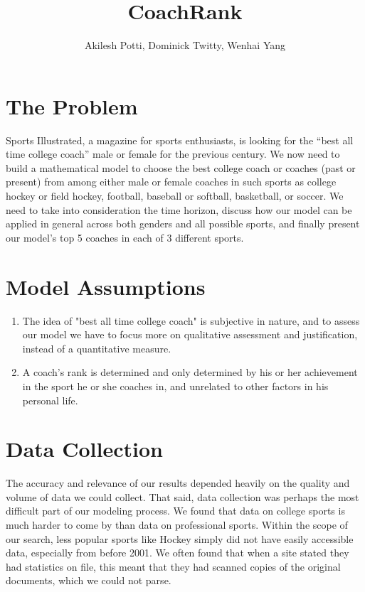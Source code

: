 \documentclass[titlepage]{article}
\begin{document}
\title{CoachRank}
\author{Akilesh Potti, Dominick Twitty, Wenhai Yang}
\maketitle


\tableofcontents

\section{The Problem}
Sports Illustrated, a magazine for sports enthusiasts, is looking for the “best all time college coach” male or female for the previous century. We now need to build a mathematical model to choose the best college coach or coaches (past or present) from among either male or female coaches in such sports as college hockey or field hockey, football, baseball or softball, basketball, or soccer. We need to take into consideration the time horizon, discuss how our model can be applied in general across both genders and all possible sports, and finally present our model’s top 5 coaches in each of 3 different sports.

\section{Model Assumptions}
\begin{enumerate}
\item The idea of "best all time college coach" is subjective in nature, and to assess our model we have to focus more on qualitative assessment and justification, instead of a quantitative measure.

\item A coach's rank is determined and only determined by his or her achievement in the sport he or she coaches in, and unrelated to other factors in his personal life.

\end{enumerate}


\section{Data Collection}
The accuracy and relevance of our results depended heavily on the quality and volume of data we could collect. That said, data collection was perhaps the most difficult part of our modeling process. We found that data on college sports is much harder to come by than data on professional sports. Within the scope of our search, less popular sports like Hockey simply did not have easily accessible data, especially from before 2001. We often found that when a site stated they had statistics on file, this meant that they had scanned copies of the original documents, which we could not parse.
\\
\end{document}
